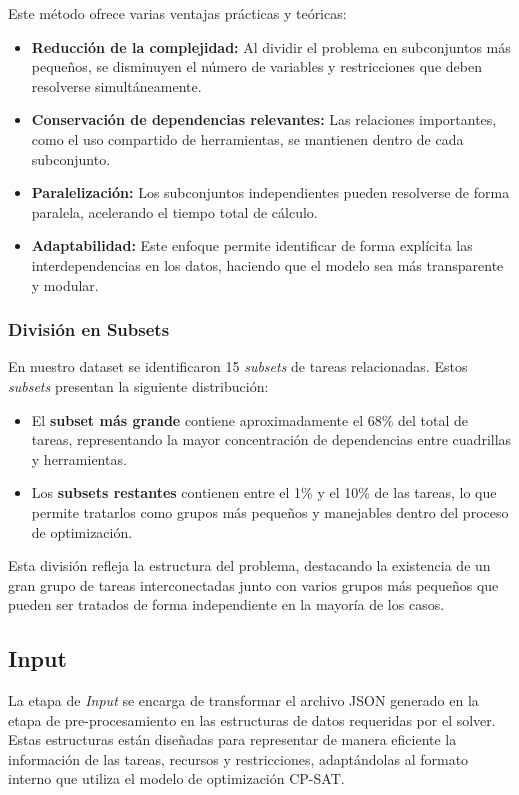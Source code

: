 \documentclass{article}
\begin{document}
Este método ofrece varias ventajas prácticas y teóricas:
\begin{itemize}
    \item \textbf{Reducción de la complejidad:} Al dividir el problema en subconjuntos más pequeños, se disminuyen el número de variables y restricciones que deben resolverse simultáneamente.
    \item \textbf{Conservación de dependencias relevantes:} Las relaciones importantes, como el uso compartido de herramientas, se mantienen dentro de cada subconjunto.
    \item \textbf{Paralelización:} Los subconjuntos independientes pueden resolverse de forma paralela, acelerando el tiempo total de cálculo.
    \item \textbf{Adaptabilidad:} Este enfoque permite identificar de forma explícita las interdependencias en los datos, haciendo que el modelo sea más transparente y modular.
\end{itemize}

\subsubsection{División en Subsets}

En nuestro dataset se identificaron 15 \textit{subsets} de tareas relacionadas. Estos \textit{subsets} presentan la siguiente distribución:
\begin{itemize}
    \item El \textbf{subset más grande} contiene aproximadamente el 68\% del total de tareas, representando la mayor concentración de dependencias entre cuadrillas y herramientas.
    \item Los \textbf{subsets restantes} contienen entre el 1\% y el 10\% de las tareas, lo que permite tratarlos como grupos más pequeños y manejables dentro del proceso de optimización.
\end{itemize}

Esta división refleja la estructura del problema, destacando la existencia de un gran grupo de tareas interconectadas junto con varios grupos más pequeños que pueden ser tratados de forma independiente en la mayoría de los casos.


\subsection{Input}

La etapa de \textit{Input} se encarga de transformar el archivo JSON generado en la etapa de pre-procesamiento en las estructuras de datos requeridas por el solver. Estas estructuras están diseñadas para representar de manera eficiente la información de las tareas, recursos y restricciones, adaptándolas al formato interno que utiliza el modelo de optimización CP-SAT. 
\end{document}
